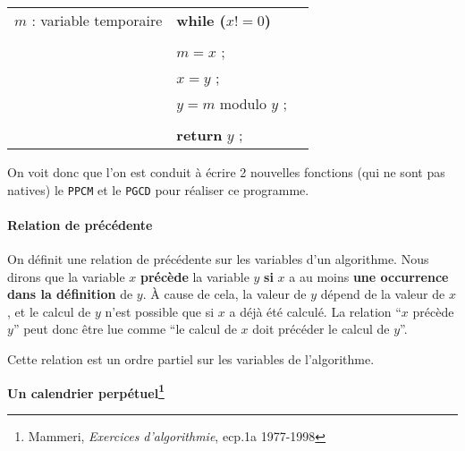 \begin{center}
{\begin{tabular}{|l|l|c|}
$m$ : variable temporaire & {\bf while (}$x !=  0${\bf )}  &       \\
                  & \hspace{0mm}{\bf \{}                   &           \\
                  & \hspace{5mm}$m = x$ ;                   &           \\
                  & \hspace{5mm}$x = y$ ;                  &           \\
                  & \hspace{5mm}$y = m$ modulo $y$ ;           &    \\
                  & \hspace{0mm}{\bf \}}                   &           \\
                  & {\bf return } $y$ ;                     &           \\
\hline
\end{tabular} }
\end{center}
On voit donc que l'on est conduit \`a \'ecrire 2 nouvelles fonctions (qui ne
sont pas natives) le {\tt PPCM} et le {\tt PGCD} pour r\'ealiser ce
programme.

\paragraph{Relation de pr\'ec\'edente}


On d\'efinit une relation de pr\'ec\'edente sur les variables d'un algorithme.
Nous dirons que la variable $x$ {\bf pr\'ec\`ede} la variable $y$ {\bf si} $x$ a au
moins {\bf une occurrence dans la d\'efinition}  de $y$.
\`A cause de cela, la valeur
de $y$ d\'epend de la valeur de $x$, et le calcul de $y$ n'est possible
que si $x$ a d\'ej\`a \'et\'e calcul\'e.  La relation ``$x$ pr\'ec\`ede $y$'' peut
donc \^etre lue comme ``le calcul de $x$ doit pr\'ec\'eder le calcul de $y$''.

Cette relation est un ordre partiel sur les variables de l'algorithme.

\newpage 
\setcounter{footnote}{0}
\addtocounter{section}{1}
\label{Perpetuel}
\centerline{\Large\bf Un calendrier perp\'etuel\footnote{Mammeri,
{\em Exercices d'algorithmie}, {\sc ecp}.1a 1977-1998}}
 
